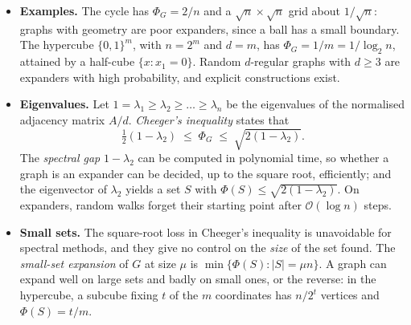 \documentclass[handoutsbeamer.tex]{subfiles}
\begin{document}
\begin{frame}
\onp{\scriptsize}
\begin{itemize}\setlength\itemsep{0.3em}
    \item \textbf{Examples.} The cycle has $\Phi_G = 2/n$ and a $\sqrt n\times\sqrt n$ grid about $1/\sqrt n$: graphs with geometry are poor expanders, since a ball has a small boundary. The hypercube $\{0,1\}^m$, with $n = 2^m$ and $d = m$, has $\Phi_G = 1/m = 1/\log_2 n$, attained by a half-cube $\{x : x_1 = 0\}$. Random $d$-regular graphs with $d\ge3$ are expanders with high probability, and explicit constructions exist.
    \item \textbf{Eigenvalues.} Let $1 = \lambda_1 \ge \lambda_2 \ge \dots \ge \lambda_n$ be the eigenvalues of the normalised adjacency matrix $A/d$. \emph{Cheeger's inequality} states that
    \begin{equation*}
        \tfrac12(1-\lambda_2) \;\le\; \Phi_G \;\le\; \sqrt{2(1-\lambda_2)}.
    \end{equation*}
    The \emph{spectral gap} $1-\lambda_2$ can be computed in polynomial time, so whether a graph is an expander can be decided, up to the square root, efficiently; and the eigenvector of $\lambda_2$ yields a set $S$ with $\Phi(S) \le \sqrt{2(1-\lambda_2)}$. On expanders, random walks forget their starting point after $\mathcal O(\log n)$ steps.
    \item \textbf{Small sets.} The square-root loss in Cheeger's inequality is unavoidable for spectral methods, and they give no control on the \emph{size} of the set found. The \emph{small-set expansion} of $G$ at size $\mu$ is $\min\{\Phi(S) : |S| = \mu n\}$. A graph can expand well on large sets and badly on small ones, or the reverse: in the hypercube, a subcube fixing $t$ of the $m$ coordinates has $n/2^t$ vertices and $\Phi(S) = t/m$.
\end{itemize}
\end{frame}
\end{document}
